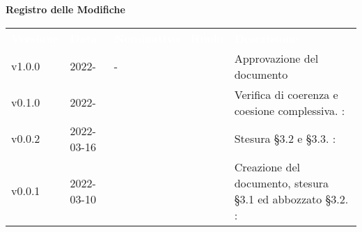 

{\LARGE{\textbf{Registro delle Modifiche}}} \\
\begin{table}[!htbp]
\renewcommand{\arraystretch}{1.5}
\begin{tabular}{ m{}<{\centering}  m{}<{\centering}  m{}<{\centering}  m{}<{\centering}  m{}<{\centering} }
	\rowcolor{darkblue}
	\textcolor{white}{\textbf{Versione}} &\textcolor{white}{\textbf{Data}}& \textcolor{white}{\textbf{Nominativo}} & \textcolor{white}{\textbf{Ruolo}}&\textcolor{white}{\textbf{Descrizione}}\\ 

	v1.0.0 & 2022- & - & \RE & Approvazione del documento \\

	v0.1.0& 2022- & \FP & \AN & Verifica di coerenza e coesione complessiva. \VE: \textit{\PV}\\

	v0.0.2& 2022-03-16 & \FP &\AN & Stesura \S{}3.2 e \S{}3.3. \VE: \textit{\PV}\\

	v0.0.1& 2022-03-10 & \GC &\AN & Creazione del documento, stesura \S{}3.1 ed abbozzato \S{}3.2. \VE: \textit{\PV}\\

\end{tabular}
\end{table}

\pagebreak
